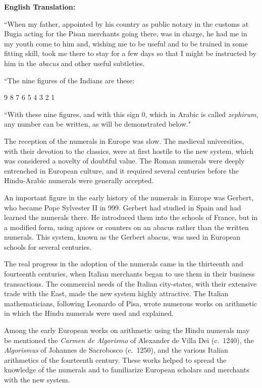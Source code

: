 \documentclass[11pt,a4paper]{article}
\newenvironment{enhancednote}{%
  \begin{tcolorbox}[colback=enhancedbg,colframe=notecolor,boxrule=1pt,
    left=10pt,right=10pt,top=8pt,bottom=8pt,
    title={\textbf{Enhanced Edition Note}},fonttitle=\bfseries\color{notecolor}]
}{\end{tcolorbox}}
\begin{document}
\begin{enhancednote}
\textbf{English Translation:}

``When my father, appointed by his country as public notary in the customs at Bugia acting for the Pisan merchants going there, was in charge, he had me in my youth come to him and, wishing me to be useful and to be trained in some fitting skill, took me there to stay for a few days so that I might be instructed by him in the \textit{abacus} and other useful subtleties.

\vspace{0.3em}
``The nine figures of the Indians are these:

\hspace{2em} 9 8 7 6 5 4 3 2 1

\vspace{0.3em}
``With these nine figures, and with this sign 0, which in Arabic is called \textit{zephirum}, any number can be written, as will be demonstrated below."
\end{enhancednote}

The reception of the numerals in Europe was slow. The medieval universities, with their devotion to the classics, were at first hostile to the new system, which was considered a novelty of doubtful value. The Roman numerals were deeply entrenched in European culture, and it required several centuries before the Hindu-Arabic numerals were generally accepted.

An important figure in the early history of the numerals in Europe was Gerbert, who became Pope Sylvester II in 999. Gerbert had studied in Spain and had learned the numerals there. He introduced them into the schools of France, but in a modified form, using apices or counters on an abacus rather than the written numerals. This system, known as the Gerbert abacus, was used in European schools for several centuries.

The real progress in the adoption of the numerals came in the thirteenth and fourteenth centuries, when Italian merchants began to use them in their business transactions. The commercial needs of the Italian city-states, with their extensive trade with the East, made the new system highly attractive. The Italian mathematicians, following Leonardo of Pisa, wrote numerous works on arithmetic in which the Hindu numerals were used and explained.

Among the early European works on arithmetic using the Hindu numerals may be mentioned the \textit{Carmen de Algorismo} of Alexander de Villa Dei (c.~1240), the \textit{Algorismus} of Johannes de Sacrobosco (c.~1250), and the various Italian arithmetics of the fourteenth century. These works helped to spread the knowledge of the numerals and to familiarize European scholars and merchants with the new system.
\end{document}

